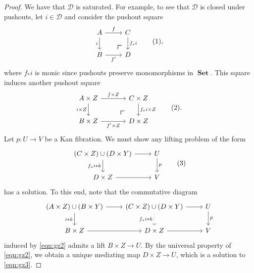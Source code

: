 \documentclass[10pt,letterpaper,cm]{nupset}
\theoremstyle{definition}
\theoremstyle{theorem}
\theoremstyle{remark}
\newcommand{\D}{\mathcal D}
\newcommand{\0}{\mathbf{0}}
\newcommand{\1}{\mathbf{1}}
\newcommand{\2}{\mathbf{2}}
\DeclareMathOperator{\set}{\mathbf{Set}}
\begin{document}
\begin{proof}
We have that $\D$ is saturated. For example, to see that $\D$ is closed under pushouts, let $i\in \D$ and consider the pushout square
\[ \label{eqn:gz1}
\begin{tikzcd}
A \arrow[d, "i"']
 \arrow[dr, phantom, "\scalebox{1.5}{\color{black}$\ulcorner$}", very near end, color=black] \arrow[r, "f"] & C \arrow[d, "f_{\ast}{i}"] \\
B \arrow[r, "f'"']               & D                  
\end{tikzcd} \tag{1}
,\] where  $f_{\ast}{i}$ is monic since pushouts preserve monomorphisms in $\set$.
This square induces another pushout square
\[ \label{eqn:gz2}
\begin{tikzcd}[column sep=large]
A\times Z \arrow[d, "i\times Z"'] 
 \arrow[dr, phantom, "\scalebox{1.5}{\color{black}$\ulcorner$}", very near end, color=black] 
 \arrow[r, "f\times Z"] & C\times Z \arrow[d, "f_{\ast}{i}\times Z"] \\
B\times Z \arrow[r, "f'\times Z"']                       & D\times Z                                 
\end{tikzcd} \tag{2}
.\] 
Let $p: U \to V$ be a Kan fibration. We must show any lifting problem of the form
\[ \label{eqn:gz3}
\begin{tikzcd}
\left(C \times Z\right) \cup \left(D \times Y \right) \arrow[d, "{f_{\ast}{i}}\mathbin{\ast}{k}"'] \arrow[r] & U \arrow[d, "p"] \\
D\times Z \arrow[r]                                                                         & V               
\end{tikzcd} \tag{3}
\] has a solution. To this end, note that the commutative diagram 
\[
\begin{tikzcd}
\left(A \times Z\right) \cup \left(B \times Y \right) \arrow[d, "i\mathbin{\ast}{k}"'] \arrow[r] & \left(C \times Z\right) \cup \left(D \times Y \right) \arrow[r] \arrow[d, "{f_{\ast}{i}}\mathbin{\ast}{k}"', dotted] & U \arrow[d, "p"] \\
B\times Z \arrow[r]                                                                                & D\times Z \arrow[r]                                                                                                    & V               
\end{tikzcd}
\] induced by \eqref{eqn:gz2} admits a lift $B\times Z \to U$. By the universal property of \eqref{eqn:gz2}, we obtain a unique mediating map $D\times Z \to U$, which is a  solution to \eqref{eqn:gz3}.

\medskip


\end{proof}
\end{document}
